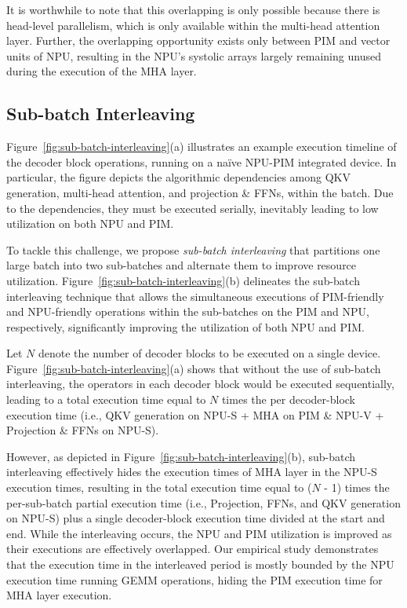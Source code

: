 
It is worthwhile to note that this overlapping is only possible because there is head-level parallelism, which is only available within the multi-head attention layer.
%
Further, the overlapping opportunity exists only between PIM and vector units of NPU, resulting in the NPU's systolic arrays largely remaining unused during the execution of the MHA layer.


%
\subsection{Sub-batch Interleaving}
\label{subsec:sub-batch}
%
%
Figure~\ref{fig:sub-batch-interleaving}(a) illustrates an example execution timeline of the decoder block operations, running on a na\"ive NPU-PIM integrated device.
%
In particular, the figure depicts the algorithmic dependencies among QKV generation, multi-head attention, and projection \& FFNs, within the batch. 
%
Due to the dependencies, they must be executed serially, inevitably leading to low utilization on both NPU and PIM.  
%

%
To tackle this challenge, we propose \textit{sub-batch interleaving} that partitions one large batch into two sub-batches and alternate them to improve resource utilization.    
%
Figure~\ref{fig:sub-batch-interleaving}(b) delineates the sub-batch interleaving technique that allows the simultaneous executions of PIM-friendly and NPU-friendly operations within the sub-batches on the PIM and NPU, respectively, significantly improving the utilization of both NPU and PIM.
%
%


%
Let $N$ denote the number of decoder blocks to be executed on a single \neupims device.
%
Figure~\ref{fig:sub-batch-interleaving}(a) shows that without the use of sub-batch interleaving, the operators in each decoder block would be executed sequentially, leading to a total execution time equal to $N$ times the per decoder-block execution time (i.e., QKV generation on NPU-S + MHA on PIM \& NPU-V + Projection \& FFNs on NPU-S). 
%

%
However, as depicted in Figure~\ref{fig:sub-batch-interleaving}(b), sub-batch interleaving effectively hides the execution times of MHA layer in the NPU-S execution times, resulting in the total execution time equal to  ($N$ - 1) times the per-sub-batch partial execution time (i.e., Projection, FFNs, and QKV generation on NPU-S) plus a single decoder-block execution time divided at the start and end.
%
While the interleaving occurs, the NPU and PIM utilization is improved as their executions are effectively overlapped.
%
Our empirical study demonstrates that the \neupims execution time in the interleaved period is mostly bounded by the NPU execution time running GEMM operations, hiding the PIM execution time for MHA layer execution.
%


